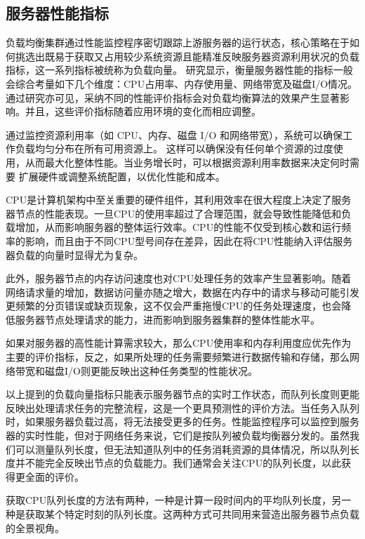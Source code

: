 \subsection{服务器性能指标}

负载均衡集群通过性能监控程序密切跟踪上游服务器的运行状态，核心策略在于如何挑选出既易于获取又占用较少系统资源且能精准反映服务器资源利用状况的负载指标，这一系列指标被统称为负载向量。
研究显示，衡量服务器性能的指标一般会综合考量如下几个维度：CPU占用率、内存使用量、网络带宽及磁盘I/O情况。通过研究亦可见，采纳不同的性能评价指标会对负载均衡算法的效果产生显著影响。并且，这些评价指标随着应用环境的变化而相应调整。

通过监控资源利用率（如 CPU、内存、磁盘 I/O 和网络带宽），系统可以确保工作负载均匀分布在所有可用资源上。
这样可以确保没有任何单个资源的过度使用，从而最大化整体性能。当业务增长时，可以根据资源利用率数据来决定何时需要
扩展硬件或调整系统配置，以优化性能和成本。

CPU是计算机架构中至关重要的硬件组件，其利用效率在很大程度上决定了服务器节点的性能表现。一旦CPU的使用率超过了合理范围，就会导致性能降低和负载增加，从而影响服务器的整体运行效率。CPU的性能不仅受到核心数和运行频率的影响，而且由于不同CPU型号间存在差异，因此在将CPU性能纳入评估服务器负载的向量时显得尤为复杂。

此外，服务器节点的内存访问速度也对CPU处理任务的效率产生显著影响。随着网络请求量的增加，数据访问量亦随之增大，数据在内存中的请求与移动可能引发更频繁的分页错误或缺页现象，这不仅会严重拖慢CPU的任务处理速度，也会降低服务器节点处理请求的能力，进而影响到服务器集群的整体性能水平。

如果对服务器的高性能计算需求较大，那么CPU使用率和内存利用度应优先作为主要的评价指标，反之，如果所处理的任务需要频繁进行数据传输和存储，那么网络带宽和磁盘I/O则更能反映出这种任务类型的性能状况。

以上提到的负载向量指标只能表示服务器节点的实时工作状态\cite{mahato2017scheduling}，而队列长度则更能反映出处理请求任务的完整流程，这是一个更具预测性的评价方法。当任务入队列时，如果服务器负载过高，将无法接受更多的任务。性能监控程序可以监控到服务器的实时性能，但对于网络任务来说，它们是按队列被负载均衡器分发的。虽然我们可以测量队列长度，但无法知道队列中的任务消耗资源的具体情况，所以队列长度并不能完全反映出节点的负载能力。我们通常会关注CPU的队列长度，以此获得更全面的评价。

获取CPU队列长度的方法有两种，一种是计算一段时间内的平均队列长度，另一种是获取某个特定时刻的队列长度。这两种方式可共同用来营造出服务器节点负载的全景视角。

